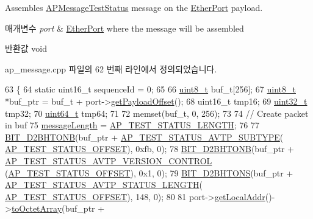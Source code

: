 Assembles \hyperlink{class_a_p_message_test_status}{A\+P\+Message\+Test\+Status} message on the \hyperlink{class_ether_port}{Ether\+Port} payload. 


\begin{DoxyParams}{매개변수}
{\em port} & \hyperlink{class_ether_port}{Ether\+Port} where the message will be assembled \\
\hline
\end{DoxyParams}
\begin{DoxyReturn}{반환값}
void 
\end{DoxyReturn}


ap\+\_\+message.\+cpp 파일의 62 번째 라인에서 정의되었습니다.


\begin{DoxyCode}
63 \{
64     \textcolor{keyword}{static} uint16\_t sequenceId = 0;
65 
66     \hyperlink{stdint_8h_aba7bc1797add20fe3efdf37ced1182c5}{uint8\_t} buf\_t[256];
67     \hyperlink{stdint_8h_aba7bc1797add20fe3efdf37ced1182c5}{uint8\_t} *buf\_ptr = buf\_t + port->\hyperlink{class_common_port_a2697fd0fc7139659877b76cd1b022d44}{getPayloadOffset}();
68     uint16\_t tmp16;
69     \hyperlink{parse_8c_a6eb1e68cc391dd753bc8ce896dbb8315}{uint32\_t} tmp32;
70     \hyperlink{parse_8c_aec6fcb673ff035718c238c8c9d544c47}{uint64\_t} tmp64;
71 
72     memset(buf\_t, 0, 256);
73 
74     \textcolor{comment}{// Create packet in buf}
75     \hyperlink{class_a_p_message_test_status_a6c490faee54bca860c4d897aae50990f}{messageLength} = \hyperlink{avbap__message_8hpp_afcd812b5eeb0a3f4663ca5af068ef39e}{AP\_TEST\_STATUS\_LENGTH};
76 
77     \hyperlink{ap__message_8cpp_a96729df4f440a649d696b081c6dfac8b}{BIT\_D2BHTONB}(buf\_ptr + \hyperlink{avbap__message_8hpp_af26d8b01eac5250bc8f9156932038616}{AP\_TEST\_STATUS\_AVTP\_SUBTYPE}(
      \hyperlink{avbap__message_8hpp_a098685900cab07ec2886722ea6b6b85e}{AP\_TEST\_STATUS\_OFFSET}), 0xfb, 0);
78     \hyperlink{ap__message_8cpp_a96729df4f440a649d696b081c6dfac8b}{BIT\_D2BHTONB}(buf\_ptr + \hyperlink{avbap__message_8hpp_a35d2a6f2afa6d26945bec0cca5871e93}{AP\_TEST\_STATUS\_AVTP\_VERSION\_CONTROL}
      (\hyperlink{avbap__message_8hpp_a098685900cab07ec2886722ea6b6b85e}{AP\_TEST\_STATUS\_OFFSET}), 0x1, 0);
79     \hyperlink{ap__message_8cpp_a320aa3b496f6b0356f37f1f09edb0734}{BIT\_D2BHTONS}(buf\_ptr + \hyperlink{avbap__message_8hpp_aba9119946a48153cb52d8ccdcde6f464}{AP\_TEST\_STATUS\_AVTP\_STATUS\_LENGTH}(
      \hyperlink{avbap__message_8hpp_a098685900cab07ec2886722ea6b6b85e}{AP\_TEST\_STATUS\_OFFSET}), 148, 0);
80 
81     port->\hyperlink{class_common_port_ab6607250666be12220407c6c12671f65}{getLocalAddr}()->\hyperlink{class_link_layer_address_a1e2896b540d2ea6182d351332737db91}{toOctetArray}(buf\_ptr + 

\end{DoxyCode}
